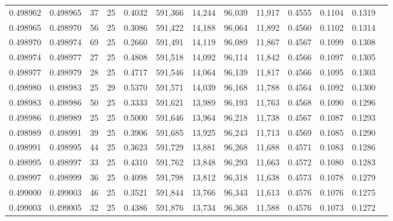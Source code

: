 \begin{tabular}{rrrrrrrrrrrrr}
0.498962 & 0.498965 &    37 &  25 &                                     0.4032 & 591,366 &  14,244 &  96,039 &  11,917 & 0.4555 & 0.1104 & 0.1319 \\
0.498965 & 0.498970 &    56 &  25 &                                     0.3086 & 591,422 &  14,188 &  96,064 &  11,892 & 0.4560 & 0.1102 & 0.1314 \\
0.498970 & 0.498974 &    69 &  25 &                                     0.2660 & 591,491 &  14,119 &  96,089 &  11,867 & 0.4567 & 0.1099 & 0.1308 \\
0.498974 & 0.498977 &    27 &  25 &                                     0.4808 & 591,518 &  14,092 &  96,114 &  11,842 & 0.4566 & 0.1097 & 0.1305 \\
0.498977 & 0.498979 &    28 &  25 &                                     0.4717 & 591,546 &  14,064 &  96,139 &  11,817 & 0.4566 & 0.1095 & 0.1303 \\
0.498980 & 0.498983 &    25 &  29 &                                     0.5370 & 591,571 &  14,039 &  96,168 &  11,788 & 0.4564 & 0.1092 & 0.1300 \\
0.498983 & 0.498986 &    50 &  25 &                                     0.3333 & 591,621 &  13,989 &  96,193 &  11,763 & 0.4568 & 0.1090 & 0.1296 \\
0.498986 & 0.498989 &    25 &  25 &                                     0.5000 & 591,646 &  13,964 &  96,218 &  11,738 & 0.4567 & 0.1087 & 0.1293 \\
0.498989 & 0.498991 &    39 &  25 &                                     0.3906 & 591,685 &  13,925 &  96,243 &  11,713 & 0.4569 & 0.1085 & 0.1290 \\
0.498991 & 0.498995 &    44 &  25 &                                     0.3623 & 591,729 &  13,881 &  96,268 &  11,688 & 0.4571 & 0.1083 & 0.1286 \\
0.498995 & 0.498997 &    33 &  25 &                                     0.4310 & 591,762 &  13,848 &  96,293 &  11,663 & 0.4572 & 0.1080 & 0.1283 \\
0.498997 & 0.498999 &    36 &  25 &                                     0.4098 & 591,798 &  13,812 &  96,318 &  11,638 & 0.4573 & 0.1078 & 0.1279 \\
0.499000 & 0.499003 &    46 &  25 &                                     0.3521 & 591,844 &  13,766 &  96,343 &  11,613 & 0.4576 & 0.1076 & 0.1275 \\
0.499003 & 0.499005 &    32 &  25 &                                     0.4386 & 591,876 &  13,734 &  96,368 &  11,588 & 0.4576 & 0.1073 & 0.1272 \\

\end{tabular}
